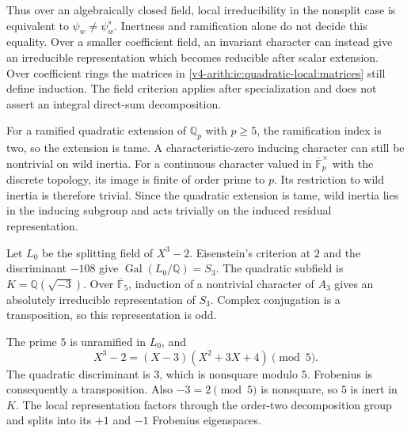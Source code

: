 Thus over an algebraically closed field, local irreducibility in the
nonsplit case is equivalent to $\psi_w\ne\psi_w^s$. Inertness and
ramification alone do not decide this equality. Over a smaller
coefficient field, an invariant character can instead give an
irreducible representation which becomes reducible after scalar extension.
Over coefficient rings the matrices in
\eqref{v4-arith:ic:quadratic-local:matrices} still define induction.
The field criterion applies after specialization and does not assert
an integral direct-sum decomposition.

For a ramified quadratic extension of $\mathbb Q_p$ with $p\ge5$,
the ramification index is two, so the extension is tame.
A characteristic-zero inducing character can still be nontrivial on
wild inertia. For a continuous character valued in
$\overline{\mathbb F}_p^\times$ with the discrete topology, its image
is finite of order prime to $p$. Its restriction to wild inertia is
therefore trivial. Since the quadratic extension is tame, wild inertia
lies in the inducing subgroup and acts trivially on the induced
residual representation.

\begin{example}
Let $L_0$ be the splitting field of $X^3-2$. Eisenstein's criterion at
$2$ and the discriminant $-108$ give
$\operatorname{Gal}(L_0/\mathbb Q)=S_3$. The quadratic subfield is
$K=\mathbb Q(\sqrt{-3})$. Over $\overline{\mathbb F}_5$, induction
of a nontrivial character of $A_3$ gives an absolutely irreducible
representation of $S_3$. Complex conjugation is a transposition,
so this representation is odd.

The prime $5$ is unramified in $L_0$, and
\[
 X^3-2=(X-3)(X^2+3X+4)\pmod5.
\]
The quadratic discriminant is $3$, which is nonsquare modulo $5$.
Frobenius is consequently a transposition. Also $-3=2\pmod5$ is
nonsquare, so $5$ is inert in $K$. The local representation factors
through the order-two decomposition group and splits into its
$+1$ and $-1$ Frobenius eigenspaces.
\end{example}


